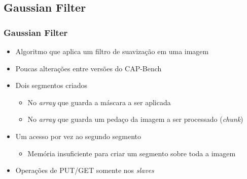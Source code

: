 \documentclass[xcolor={table}]{beamer}
\begin{document}
\subsection{Gaussian Filter}
\begin{frame}\frametitle{Gaussian Filter}
    \begin{itemize}
        \item {Algoritmo que aplica um filtro de suavização em uma imagem}
        \item {Poucas alterações entre versões do CAP-Bench}
        \item {Dois segmentos criados}
        \begin{itemize}
            \item {No \textit{array} que guarda a máscara a ser aplicada}
            \item {No \textit{array} que guarda um pedaço da imagem a ser processado (\textit{chunk})}
        \end{itemize}
        \item {Um acesso por vez ao segundo segmento}
        \begin{itemize}
            \item {Memória insuficiente para criar um segmento sobre toda a imagem}
        \end{itemize}
        \item {Operações de PUT/GET somente nos \textit{slaves}}
    \end{itemize}
\end{frame}
\end{document}
